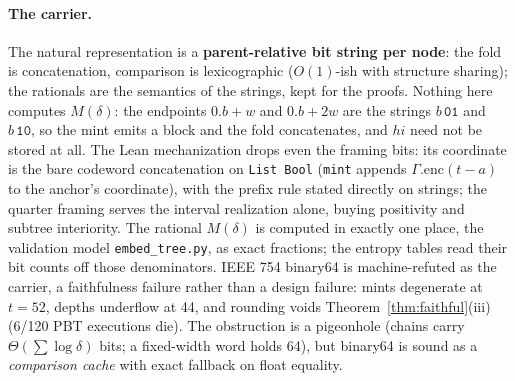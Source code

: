 \documentclass[11pt]{article}
\newcommand{\code}[1]{\texttt{#1}}
\begin{document}
\paragraph{The carrier.} The natural representation is a
\textbf{parent-relative bit string per node}: the fold is
concatenation, comparison is lexicographic ($O(1)$-ish with
structure sharing); the rationals are the semantics of the strings,
kept for the proofs. Nothing here computes $M(\delta)$: the
endpoints $0.b + w$ and $0.b + 2w$ are the strings $b\,\code{01}$
and $b\,\code{10}$, so the mint emits a block and the fold
concatenates, and $hi$ need not be stored at all. The Lean
mechanization drops even the framing bits: its coordinate is the
bare codeword concatenation on \code{List Bool} (\code{mint} appends
$\Gamma.\mathrm{enc}(t - a)$ to the anchor's coordinate), with the
prefix rule stated directly on strings; the quarter framing serves
the interval realization alone, buying positivity and subtree
interiority. The rational $M(\delta)$ is computed in exactly one
place, the validation model \code{embed\_tree.py}, as exact
fractions; the entropy tables read their bit counts off those
denominators. IEEE 754 binary64 is machine-refuted as the
carrier, a faithfulness failure rather than a design failure: mints
degenerate at $t = 52$, depths underflow at 44, and rounding voids
Theorem~\ref{thm:faithful}(iii) (6/120 PBT executions die). The
obstruction is a pigeonhole (chains carry $\Theta(\sum \log
\delta)$ bits; a fixed-width word holds 64), but binary64 is sound
as a \emph{comparison cache} with exact fallback on float equality.
\end{document}
